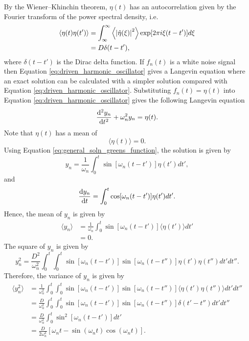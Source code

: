 By the Wiener–Khinchin theorem, $\eta(t)$ has an autocorrelation given by the Fourier transform of the power spectral density, i.e.
\begin{equation}
    \label{eq:autocorrelation}
    \begin{aligned}
    \langle\eta(t) \eta(t')\rangle &= \int_{\infty}^\infty \left\langle\abs{\hat{\eta}(\xi)}^2\right\rangle\exp[2\pi i \xi (t - t')] d\xi \\
    &=D\delta(t-t'),
    \end{aligned}
\end{equation}
where $\delta(t-t')$ is the Dirac delta function. 
If $f_n(t)$ is a white noise signal then Equation \eqref{eq:driven_harmonic_oscillator} gives a Langevin equation where an exact solution can be calculated with a simpler solution compared with Equation \eqref{eq:driven_harmonic_oscillator}. Substituting $f_n(t)=\eta(t)$ into Equation \eqref{eq:driven_harmonic_oscillator} gives the following Langevin equation
\begin{equation}
    \dv[2]{y_n}{t} + \omega_n^2 y_n = \eta(t).
\end{equation}
Note that $\eta(t)$ has a mean of
\begin{equation}
    \langle\eta(t)\rangle=0.
\end{equation}
Using Equation \eqref{eq:general_soln_greens_function}, the solution is given by
\begin{equation}
    y_n = \frac{1}{\omega_n}\int_0^t\sin[\omega_n(t-t')]\eta(t')dt',
\end{equation}
and
\begin{equation}
    \dv{y_n}{t} = \int_0^t\cos[\omega_n(t-t')]\eta(t')dt'.
\end{equation}
Hence, the mean of $y_n$ is given by
\begin{equation}
    \begin{aligned}
    \langle y_n \rangle &= \frac{1}{\omega_n}\int_0^t\sin[\omega_n(t-t')]\langle \eta(t') \rangle dt' \\
    &= 0.
    \end{aligned}
\end{equation}
The square of $y_n$ is given by
\begin{equation}
    y_n^2 = \frac{D^2}{\omega_n^2}\int_0^t\int_0^t\sin[\omega_n(t-t')]\sin[\omega_n(t-t'')]\eta(t')\eta(t'')dt'dt''.
\end{equation}
Therefore, the variance of $y_n$ is given by
\begin{equation}
    \label{eq:variance_exact_red_force}
    \begin{aligned}
    \langle y_n^2 \rangle &= \frac{1}{\omega_n^2}\int_0^t\int_0^t\sin[\omega_n(t-t')]\sin[\omega_n(t-t'')]\langle \eta(t')\eta(t'')\rangle dt'dt'' \\
    &= \frac{D}{\omega_n^2}\int_0^t\int_0^t\sin[\omega_n(t-t')]\sin[\omega_n(t-t'')]\delta(t'-t'') dt'dt'' \\
    &= \frac{D}{\omega_n^2}\int_0^t\sin^2[\omega_n(t-t')] dt' \\
    &=\frac{D}{2\omega_n^3}[\omega_n t - \sin(\omega_n t) \cos(\omega_n t)].
    \end{aligned}
\end{equation}
